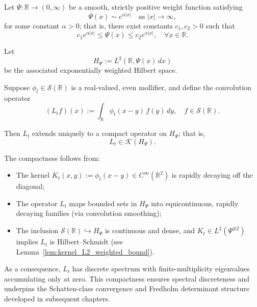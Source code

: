 \begin{proposition}[Compactness of \( L_t \)]
\label{prop:compactness_Lt}
Let \( \Psi \colon \mathbb{R} \to (0,\infty) \) be a smooth, strictly positive weight function satisfying
\[
\Psi(x) \sim e^{\alpha|x|} \quad \text{as } |x| \to \infty,
\]
for some constant \( \alpha > 0 \); that is, there exist constants \( c_1, c_2 > 0 \) such that
\[
c_1 e^{\alpha |x|} \le \Psi(x) \le c_2 e^{\alpha |x|}, \quad \forall x \in \mathbb{R}.
\]

Let
\[
H_\Psi := L^2(\mathbb{R}, \Psi(x)\, dx)
\]
be the associated exponentially weighted Hilbert space.

Suppose \( \phi_t \in \mathcal{S}(\mathbb{R}) \) is a real-valued, even mollifier, and define the convolution operator
\[
(L_t f)(x) := \int_{\mathbb{R}} \phi_t(x - y)\, f(y)\, dy, \quad f \in \mathcal{S}(\mathbb{R}).
\]

Then \( L_t \) extends uniquely to a compact operator on \( H_\Psi \); that is,
\[
L_t \in \mathcal{K}(H_\Psi).
\]

\noindent The compactness follows from:
\begin{itemize}
    \item The kernel \( K_t(x,y) := \phi_t(x - y) \in C^\infty(\mathbb{R}^2) \) is rapidly decaying off the diagonal;
    \item The operator \( L_t \) maps bounded sets in \( H_\Psi \) into equicontinuous, rapidly decaying families (via convolution smoothing);
    \item The inclusion \( \mathcal{S}(\mathbb{R}) \hookrightarrow H_\Psi \) is continuous and dense, and \( K_t \in L^2(\Psi^{\otimes 2}) \) implies \( L_t \) is Hilbert–Schmidt (see Lemma~\ref{lem:kernel_L2_weighted_bound}).
\end{itemize}

\medskip
\noindent As a consequence, \( L_t \) has discrete spectrum with finite-multiplicity eigenvalues accumulating only at zero. This compactness ensures spectral discreteness and underpins the Schatten-class convergence and Fredholm determinant structure developed in subsequent chapters.
\end{proposition}
